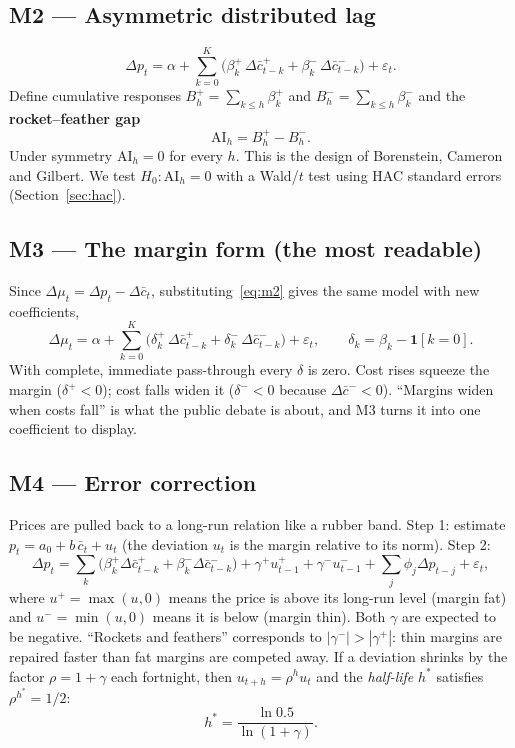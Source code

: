 \documentclass[11pt,a4paper]{article}
\theoremstyle{definition}
\newcommand{\AI}{\mathrm{AI}}
\newcommand{\ind}{\mathbf{1}}
\begin{document}
\subsection*{M2 --- Asymmetric distributed lag}
\begin{equation}\label{eq:m2}
\Delta p_t = \alpha + \sum_{k=0}^{K}\Big(\beta^{+}_k\,\Delta\bar c^{+}_{t-k} + \beta^{-}_k\,\Delta\bar c^{-}_{t-k}\Big) + \varepsilon_t .
\end{equation}
Define cumulative responses $B^{+}_h=\sum_{k\le h}\beta^{+}_k$ and $B^{-}_h=\sum_{k\le h}\beta^{-}_k$ and the \textbf{rocket--feather gap}
\begin{equation}
\AI_h = B^{+}_h - B^{-}_h .
\end{equation}
Under symmetry $\AI_h = 0$ for every $h$. This is the design of Borenstein, Cameron and Gilbert\cite{bcg97}. We test $H_0:\AI_h=0$ with a Wald/$t$ test using
HAC standard errors (Section~\ref{sec:hac}).

\subsection*{M3 --- The margin form (the most readable)}
Since $\Delta\mu_t = \Delta p_t - \Delta\bar c_t$, substituting~\eqref{eq:m2} gives the same model with new coefficients,
\begin{equation}\label{eq:m3}
\Delta\mu_t = \alpha + \sum_{k=0}^{K}\Big(\delta^{+}_k\,\Delta\bar c^{+}_{t-k} + \delta^{-}_k\,\Delta\bar c^{-}_{t-k}\Big) + \varepsilon_t,\qquad
\delta_k=\beta_k - \ind[k=0] .
\end{equation}
With complete, immediate pass-through every $\delta$ is zero. Cost rises squeeze the margin ($\delta^{+}<0$); cost falls widen it
($\delta^{-}<0$ because $\Delta\bar c^{-}<0$). ``Margins widen when costs fall'' is what the public debate is about, and M3 turns it into one coefficient to display.

\subsection*{M4 --- Error correction}
Prices are pulled back to a long-run relation like a rubber band. Step 1: estimate $p_t = a_0 + b\,\bar c_t + u_t$ (the deviation $u_t$ is the margin
relative to its norm). Step 2:
\begin{equation}\label{eq:m4}
\Delta p_t = \sum_k\Big(\beta^{+}_k\Delta\bar c^{+}_{t-k}+\beta^{-}_k\Delta\bar c^{-}_{t-k}\Big)+\gamma^{+}u^{+}_{t-1}+\gamma^{-}u^{-}_{t-1}+\sum_j\phi_j\Delta p_{t-j}+\varepsilon_t,
\end{equation}
where $u^{+}=\max(u,0)$ means the price is above its long-run level (margin fat) and $u^{-}=\min(u,0)$ means it is below (margin thin). Both $\gamma$ are
expected to be negative. ``Rockets and feathers'' corresponds to $|\gamma^{-}|>|\gamma^{+}|$: thin margins are repaired faster than fat margins are competed away.
If a deviation shrinks by the factor $\rho=1+\gamma$ each fortnight, then $u_{t+h}=\rho^h u_t$ and the \emph{half-life} $h^\ast$ satisfies $\rho^{h^\ast}=1/2$:
\begin{equation}\label{eq:halflife}
h^\ast = \frac{\ln 0.5}{\ln(1+\gamma)} .
\end{equation}
\end{document}

